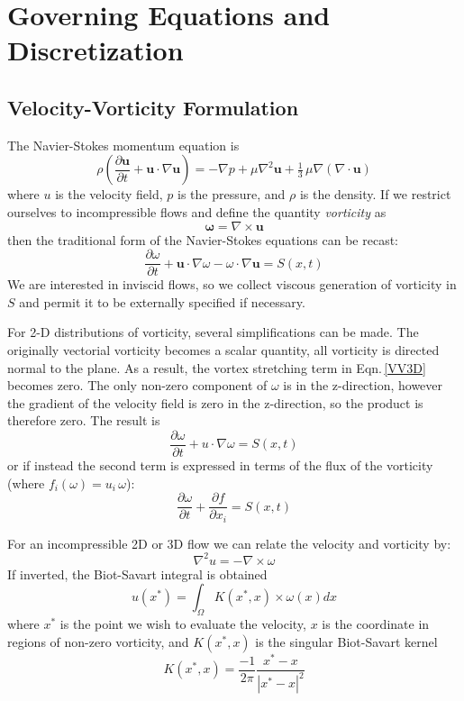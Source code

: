 \documentclass[]{aiaa-tc}%
\newcommand{\be}{\begin{equation}}
\newcommand{\ben}[1]{\begin{equation}\label{#1}}
\newcommand{\ee}{\end{equation}}
\begin{document}
\section{Governing Equations and Discretization}
\subsection{Velocity-Vorticity Formulation}
The Navier-Stokes momentum equation is
 \be \rho \left(\frac{\partial \mathbf{u}}{\partial t} + \mathbf{u} \cdot \nabla \mathbf{u} \right) = -\nabla p + \mu \nabla^2 \mathbf u + \tfrac13 \, \mu \nabla (\nabla\cdot\mathbf{u}) \ee
where $u$ is the velocity field, $p$ is the pressure, and $\rho$ is the density. If we restrict ourselves to incompressible flows and define the quantity \textit{vorticity} as
\be \mathbf{\omega} = \nabla \times \mathbf{u} \ee
then the traditional form of the Navier-Stokes equations can be recast:
\ben{VV3D} \frac{\partial \omega}{\partial t} +  \mathbf{u} \cdot \nabla \omega - \omega \cdot \nabla  \mathbf{u} = S(x,t)\ee
We are interested in inviscid flows, so we collect viscous generation of vorticity in $S$ and permit it to be externally specified if necessary.

For 2-D distributions of vorticity, several simplifications can be made. The originally vectorial vorticity becomes a scalar quantity, all vorticity is directed normal to the plane. As a result, the vortex stretching term in  Eqn.\,\eqref{VV3D} becomes zero. The only non-zero component of $\omega$ is in the z-direction, however the gradient of the velocity field is zero in the z-direction, so the product is therefore zero. The result is
\ben{VV2D} \frac{\partial \omega}{\partial t} + u \cdot \nabla \omega = S(x,t)\ee
or if instead the second term is expressed in terms of the flux of the vorticity (where $f_i(\omega)=u_i\,\omega$):
\ben{VV2DB} \frac{\partial \omega}{\partial t} + \frac{\partial f}{\partial x_i}= S(x,t)\ee

 For an incompressible 2D or 3D flow we can relate the velocity and vorticity by:
\be \nabla^2 u = -\nabla \times \omega \ee
If inverted, the Biot-Savart integral is obtained
\ben{BS} u(x^*) = \int_\Omega K(x^*,x) \times \omega(x) dx \ee
where $x^*$ is the point we wish to evaluate the velocity, $x$ is the coordinate in regions of non-zero vorticity, and $K(x^*,x)$ is the singular Biot-Savart kernel \cite{BealeMajda}
\ben{BSkern} K(x^*,x) = \frac{-1}{2 \pi} \frac{x^*-x}{|x^*-x|^2} \ee
\end{document}
